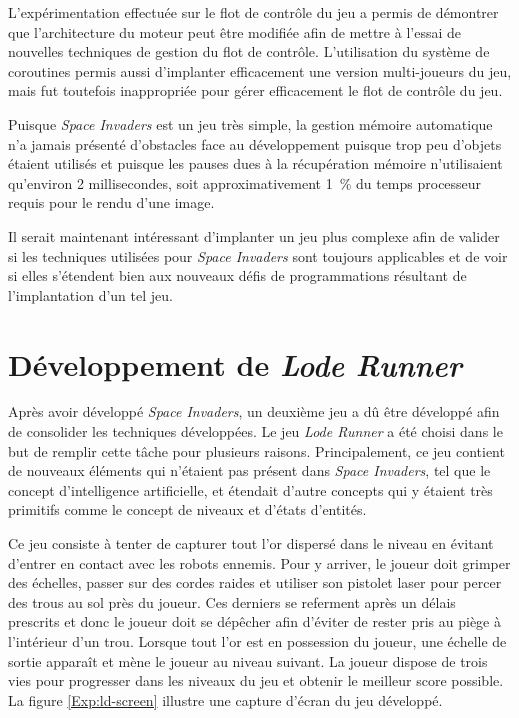 \documentclass[12pt,twoside,letterpaper,francais]{book}
\begin{document}
L'expérimentation effectuée sur le flot de contrôle du jeu a permis de
démontrer que l'architecture du moteur peut être modifiée afin de
mettre à l'essai de nouvelles techniques de gestion du flot de
contrôle. L'utilisation du système de coroutines permis aussi
d'implanter efficacement une version multi-joueurs du jeu, mais fut
toutefois inappropriée pour gérer efficacement le flot de contrôle du
jeu.

Puisque \textit{Space Invaders} est un jeu très simple, la gestion mémoire automatique n'a
jamais présenté d'obstacles face au dévelop\-pement puisque trop peu
d'objets étaient utilisés et puisque les pauses dues à la récupération
mémoire n'utilisaient qu'environ 2 millisecondes, soit
approximativement 1~\% du temps processeur requis pour le rendu d'une
image.

Il serait maintenant intéressant d'implanter un jeu plus complexe afin
de valider si les techniques utilisées pour \textit{Space Invaders} sont toujours
applicables et de voir si elles s'étendent bien aux nouveaux défis de
programmations résultant de l'implantation d'un tel jeu.


\FloatBarrier
\section{Dévelop\-pement de \textit{Lode Runner}} \label{Exp:ld}
Après avoir développé \textit{Space Invaders}, un deuxième jeu a dû
être développé afin de consolider les techniques développées. Le jeu
\textit{Lode Runner} a été choisi dans le but de remplir cette tâche
pour plusieurs raisons. Principalement, ce jeu contient de nouveaux
éléments qui n'étaient pas présent dans \textit{Space Invaders}, tel
que le concept d'intelligence artificielle, et étendait d'autre
concepts qui y étaient très primitifs comme le concept de niveaux et
d'états d'entités.

Ce jeu consiste à tenter de capturer tout l'or dispersé dans le niveau
en évitant d'entrer en contact avec les robots ennemis. Pour y
arriver, le joueur doit grimper des échelles, passer sur des cordes
raides et utiliser son pistolet laser pour percer des trous au sol
près du joueur. Ces derniers se referment après un délais prescrits et
donc le joueur doit se dépêcher afin d'éviter de rester pris au piège
à l'intérieur d'un trou. Lorsque tout l'or est en possession du
joueur, une échelle de sortie apparaît et mène le joueur au niveau
suivant. La joueur dispose de trois vies pour progresser dans les
niveaux du jeu et obtenir le meilleur score possible. La figure
\ref{Exp:ld-screen} illustre une capture d'écran du jeu développé.\\
\end{document}
